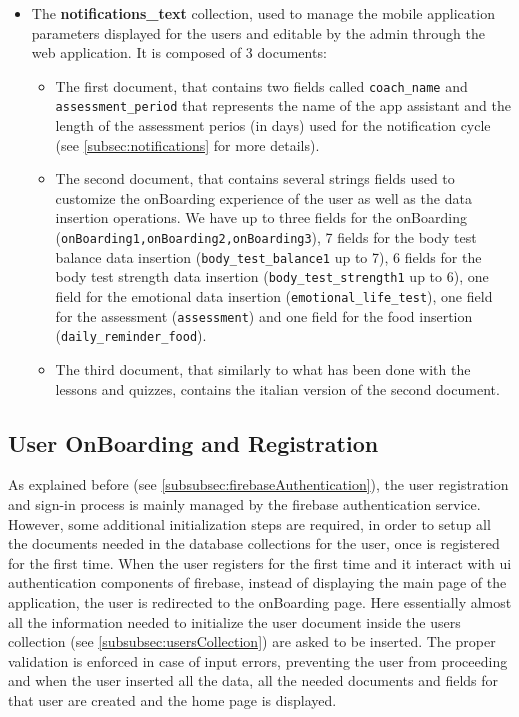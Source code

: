 \begin{itemize}[nosep] %
    \item The \textbf{notifications\_text} collection, used to manage the mobile application parameters displayed for the users and editable by the admin through the web application. It is composed of 3 documents:
    \begin{itemize}[nosep]
        \item The first document, that contains two fields called \texttt{coach\_name} and \newline \texttt{assessment\_period} that represents the name of the app assistant and the length of the assessment perios (in days) used for the notification cycle (see \cref{subsec:notifications} for more details).
        \item The second document, that contains several strings fields used to customize the onBoarding experience of the user as well as the data insertion operations. We have up to three fields for the onBoarding (\texttt{onBoarding1,onBoarding2,onBoarding3}), 7 fields for the body test balance data insertion (\texttt{body\_test\_balance1} up to 7), 6 fields for the body test strength data insertion (\texttt{body\_test\_strength1} up to 6), one field for the emotional data insertion (\texttt{emotional\_life\_test}), one field for the assessment (\texttt{assessment}) and one field for the food insertion (\texttt{daily\_reminder\_food}).
        \item The third document, that similarly to what has been done with the lessons and quizzes, contains the italian version of the second document.
    \end{itemize}
\end{itemize}
\newpage
\subsection{User OnBoarding and Registration}
As explained before (see \cref{subsubsec:firebaseAuthentication}), the user registration and sign-in process is mainly managed by the firebase authentication service. However, some additional initialization steps are required, in order to setup all the documents needed in the database collections for the user, once is registered for the first time. When the user registers for the first time and it interact with ui authentication components of firebase, instead of displaying the main page of the application, the user is redirected to the onBoarding page. Here essentially almost all the information needed to initialize the user document inside the users collection (see \cref{subsubsec:usersCollection}) are asked to be inserted. The proper validation is enforced in case of input errors, preventing the user from proceeding and when the user inserted all the data, all the needed documents and fields for that user are created and the home page is displayed. 

